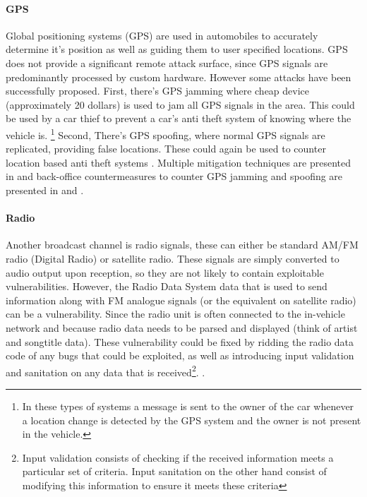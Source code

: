 \documentclass[master=cws,masteroption=vs,english]{kulemt}
\begin{document}
\paragraph{GPS} Global positioning systems (GPS) are used in automobiles to accurately determine it's position as well as guiding them to user specified locations. GPS does not provide a significant remote attack surface, since GPS signals are predominantly processed by custom hardware\cite{Kosher}. However some attacks have been successfully proposed. First, there's GPS jamming where cheap device (approximately 20 dollars) is used to jam all GPS signals in the area. This could be used by a car thief to prevent a car's anti theft system of knowing where the vehicle is. \footnote{In these types  of systems a message is sent to the owner of the car whenever a location change is detected by the GPS system and the owner is not present in the vehicle.} Second, There's GPS spoofing, where normal GPS signals are replicated, providing false locations. These could again be used to counter location based anti theft systems \cite{Petit}. Multiple mitigation techniques are presented in \cite{GPS1} and back-office countermeasures to counter GPS jamming and spoofing are presented in \cite{GPS2} and \cite{GPS3}. 

\paragraph{Radio} Another broadcast channel is radio signals, these can either be standard AM/FM radio (Digital Radio) or satellite radio. These signals are simply converted to audio output upon reception, so they are not likely to contain exploitable vulnerabilities. However, the Radio Data System data that is used to send information along with FM analogue signals (or the equivalent on satellite radio) can be a vulnerability. Since the radio unit is often connected to the in-vehicle network and because radio data needs to be parsed and displayed (think of artist and songtitle data). These vulnerability could be fixed by ridding the radio data code of any bugs that could be exploited, as well as introducing input validation and sanitation on any data that is received\footnote{Input validation consists of checking if the received information meets a particular set of criteria. Input sanitation on the other hand consist of modifying this information to ensure it meets these criteria}. \cite{MillerA}\cite{MillerD}\cite{Kosher}. 
\end{document}
